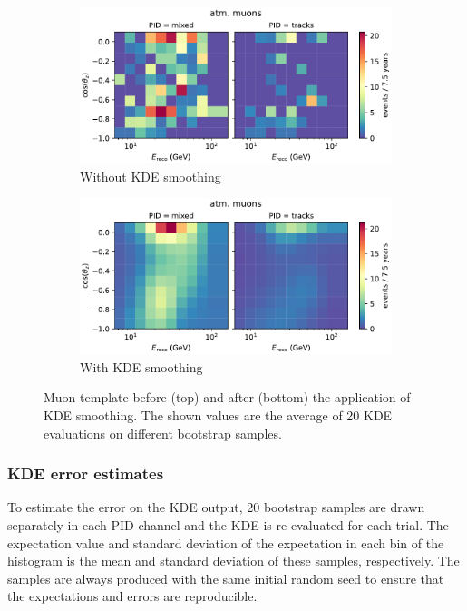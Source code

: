 \begin{figure}[H] 
    \centering
    \begin{subfigure}{0.8\textwidth}
        \centering
        \includegraphics[width=\textwidth,trim={0 0 0 0.6cm},clip]{figures/measurement/systematics/muons/muon_hist_no_kde.pdf}
        \caption{Without KDE smoothing}
        \label{fig:muon-template-no-kde}
    \end{subfigure}
    \begin{subfigure}{0.8\textwidth}
        \centering
        \includegraphics[width=\textwidth,trim={0 0 0 0.6cm},clip]{figures/measurement/systematics/muons/plot_maps_muon.pdf}
        \caption{With KDE smoothing}
        \label{fig:muon-template-with-kde}
    \end{subfigure}
    
    \caption{Muon template before (top) and after (bottom) the application of KDE smoothing. The shown values are the average of 20 KDE evaluations on different bootstrap samples.}
    \label{fig:muon-kde-smoothing}
\end{figure}

\subsubsection{KDE error estimates}
To estimate the error on the KDE output, 20 bootstrap samples are drawn separately in each PID channel and the KDE is re-evaluated for each trial.
The expectation value and standard deviation of the expectation in each bin of the histogram is the mean and standard deviation of these samples, respectively.
The samples are always produced with the same initial random seed to ensure that the expectations and errors are reproducible.
